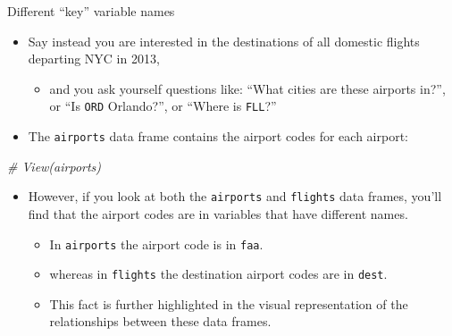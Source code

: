 \documentclass[
  ignorenonframetext,
]{beamer}
\newenvironment{Shaded}{\begin{snugshade}}{\end{snugshade}}
\newcommand{\CommentTok}[1]{\textcolor[rgb]{0.56,0.35,0.01}{\textit{#1}}}
\providecommand{\tightlist}{%
  \setlength{\itemsep}{0pt}\setlength{\parskip}{0pt}}
\begin{document}
\begin{frame}[fragile]{Different ``key'' variable names}
\protect\hypertarget{different-key-variable-names}{}
\begin{itemize}
\item
  Say instead you are interested in the destinations of all domestic
  flights departing NYC in 2013,

  \begin{itemize}
  \tightlist
  \item
    and you ask yourself questions like: ``What cities are these
    airports in?'', or ``Is \texttt{ORD} Orlando?'', or ``Where is
    \texttt{FLL}?''
  \end{itemize}
\item
  The \texttt{airports} data frame contains the airport codes for each
  airport:
\end{itemize}

\normalsize

\begin{Shaded}
\begin{Highlighting}[]
\CommentTok{\# View(airports)}
\end{Highlighting}
\end{Shaded}

\normalsize

\begin{itemize}
\item
  However, if you look at both the \texttt{airports} and
  \texttt{flights} data frames, you'll find that the airport codes are
  in variables that have different names.

  \begin{itemize}
  \tightlist
  \item
    In \texttt{airports} the airport code is in \texttt{faa}.
  \item
    whereas in \texttt{flights} the destination airport codes are in
    \texttt{dest}.
  \item
    This fact is further highlighted in the visual representation of the
    relationships between these data frames.
  \end{itemize}
\end{itemize}
\end{frame}
\end{document}
